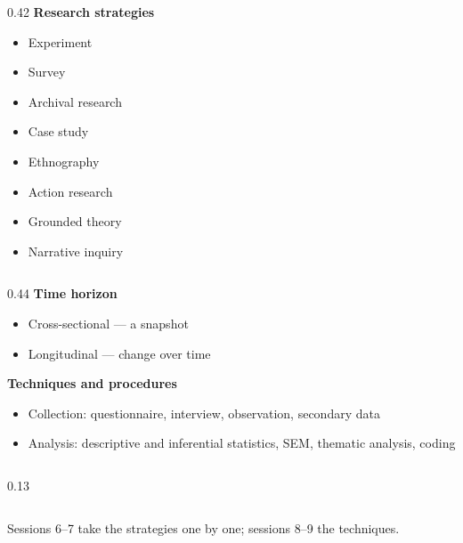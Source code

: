 \documentclass[11pt,a4paper,british,twoside=false,headings=small,chapterprefix=false,numbers=noenddot]{scrbook}
\newif\ifcolopen
\newenvironment{columns}[1][]{\par\noindent\colopenfalse\ignorespaces}%
  {\ifcolopen\end{minipage}\fi\par\vspace{0.4em}}
\newcommand{\src}[1]{{\scriptsize\color{uiagrey}#1}}
\newcommand{\onionloc}[7]{}
\begin{document}
\begin{center}\small
\begin{columns}[T,onlytextwidth]
    \begin{column}{0.42\textwidth}
      {\color{uiared}\bfseries Research strategies}
      \begin{itemize}\footnotesize\setlength{\itemsep}{0.15em}
        \item Experiment
        \item Survey
        \item Archival research
        \item Case study
        \item Ethnography
        \item Action research
        \item Grounded theory
        \item Narrative inquiry
      \end{itemize}
    \end{column}
    \begin{column}{0.44\textwidth}
      {\color{uiared}\bfseries Time horizon}
      \begin{itemize}\footnotesize\setlength{\itemsep}{0.15em}
        \item Cross-sectional --- a snapshot
        \item Longitudinal --- change over time
      \end{itemize}
      
      {\color{uiared}\bfseries Techniques and procedures}
      \begin{itemize}\footnotesize\setlength{\itemsep}{0.15em}
        \item Collection: questionnaire, interview, observation, secondary data
        \item Analysis: descriptive and inferential statistics, SEM, thematic analysis, coding
      \end{itemize}
    \end{column}
    \begin{column}{0.13\textwidth}\ \end{column}
  \end{columns}
  
  \src{Sessions 6--7 take the strategies one by one; sessions 8--9 the techniques.}
  \onionloc{0}{0}{0}{1}{1}{1}{Layers 4--6}
\end{center}
\end{document}
